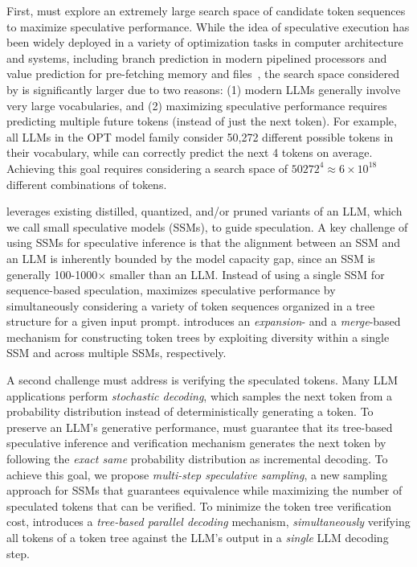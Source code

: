 First, \SpecInfer must explore an extremely large search space of candidate token sequences to maximize speculative performance. While the idea of speculative execution has been widely deployed in a variety of optimization tasks in computer architecture and systems, including branch prediction in modern pipelined processors and value prediction for pre-fetching memory and files~\cite{gabbay1996speculative,smith1998study}, the search space considered by \SpecInfer is significantly larger due to two reasons:
(1) modern LLMs generally involve very large vocabularies, and (2) maximizing speculative performance requires predicting multiple future tokens (instead of just the next token). For example, all LLMs in the OPT model family consider 50,272 different possible tokens in their vocabulary, while \SpecInfer can correctly predict the next 4 tokens on average. Achieving this goal requires considering a search space of $50272^4\approx6\times 10^{18}$ different combinations of tokens.

\SpecInfer leverages existing distilled, quantized, and/or pruned variants of an LLM, which we call small speculative models (SSMs), to guide speculation.
A key challenge of using SSMs for speculative inference is that the alignment between an SSM and an LLM is inherently bounded by the model capacity gap, since an SSM is generally 100-1000$\times$ smaller than an LLM.
Instead of using a single SSM for sequence-based speculation, \SpecInfer maximizes speculative performance by simultaneously considering a variety of token sequences organized in a tree structure for a given input prompt.
\SpecInfer introduces an {\em expansion}- and a {\em merge}-based mechanism for constructing token trees by exploiting diversity within a single SSM and across multiple SSMs, respectively.

A second challenge \SpecInfer must address is verifying the speculated tokens. Many LLM applications perform {\em stochastic decoding}, which samples the next token from a probability distribution instead of deterministically generating a token.
To preserve an LLM's generative performance, \SpecInfer must guarantee that its tree-based speculative inference and verification mechanism generates the next token by following the {\em exact same} probability distribution as incremental decoding.
To achieve this goal, we propose {\em multi-step speculative sampling}, a new sampling approach for SSMs that guarantees equivalence while maximizing the number of speculated tokens that can be verified.
To minimize the token tree verification cost, \SpecInfer introduces a {\em tree-based parallel decoding} mechanism, {\em simultaneously} verifying all tokens of a token tree against the LLM's output in a {\em single} LLM decoding step.

